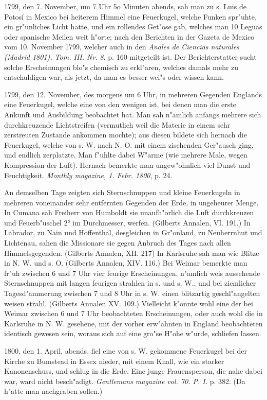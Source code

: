 \documentclass[a4paper, 11pt, oneside, polutonikogreek, german]{article}
\begin{document}
1799, den 7. November, um 7 Uhr 5o Minuten abends, sah man zu s. Luis de Potosí in Mexico bei heiterem Himmel eine Feuerkugel, welche Funken spr"uhte, ein gr"unliches Licht hatte, und ein rollendes Get"ose gab, welches man 10 Leguas oder spanische Meilen weit h"orte; nach den Berichten in der Gazeta de Mexico vom 10. November 1799, welcher auch in den \emph{Anales de Ciencias naturales (Madrid 1801), Tom. III. Nr. 8}, p. 160 mitgeteilt ist. Der Berichterstatter sucht solche Erscheinungen blo"s chemisch zu erkl"aren, welches damals mehr zu entschuldigen war, als jetzt, da man es besser wei"s oder wissen kann.

1799, den 12. November, des morgens um 6 Uhr, in mehreren Gegenden Englands eine Feuerkugel, welche eine von den wenigen ist, bei denen man die erste Ankunft und Ausbildung beobachtet hat. Man sah n"amlich anfangs mehrere sich durchkreuzende Lichtstreifen (vermutlich weil die Materie in einem sehr zerstreuten Zustande ankommen mochte); aus diesen bildete sich hernach die Feuerkugel, welche von s. W. nach N. O. mit einem zischenden Ger"ausch ging, und endlich zerplatzte. Man f"uhlte dabei W"arme (wie mehrere Male, wegen Kompression der Luft). Hernach bemerkte man ungew"ohnlich viel Dunst und Feuchtigkeit. \emph{Monthly magazine, 1. Febr. 1800}, p. 24.

An demselben Tage zeigten sich Sternschnuppen und kleine Feuerkugeln in mehreren voneinander sehr entfernten Gegenden der Erde, in ungeheurer Menge. In Cumana sah Freiherr von Humboldt sie unaufh"orlich die Luft durchkreuzen und Feuerb"uschel 2° im Durchmesser, werfen. (Gilberts Annalen, VI. 191.) In Labrador, zu Nain und Hoffenthal, desgleichen in Gr"onland, zu Neuherrnhut und Lichtenau, sahen die Missionare sie gegen Anbruch des Tages nach allen Himmelsgegenden. (Gilberts Annalen, XII. 217) In Karlsruhe sah man wie Blitze in N. W. und s. O. (Gilberts Annalen, XIV. 116.) Bei Weimar bemerkte man fr"uh zwischen 6 und 7 Uhr vier feurige Erscheinungen, n"amlich weis aussehende Sternschnuppen mit langen feurigen strahlen in s. und s. W., und bei ziemlicher Tagesd"ammerung zwischen 7 und 8 Uhr in s. W. einen blitzartig geschl"angelten weisen strahl. (Gilberts Annalen XV. 109.) Vielleicht k"onnte wohl eine der bei Weimar zwischen 6 und 7 Uhr beobachteten Erscheinungen, oder auch wohl die in Karlsruhe in N. W. gesehene, mit der vorher erw"ahnten in England beobachteten identisch gewesen sein, woraus sich auf eine gro"se H"ohe w"urde, schliefen lassen.

1800, den 1. April, abends, fiel eine von s. W. gekommene Feuerkugel bei der Kirche zu Bumstead in Essex nieder, mit einem Knall, wie ein starker Kanonenschuss, und schlug in die Erde. Eine junge Frauensperson, die nahe dabei war, ward nicht besch"adigt. \emph{Gentlemans magazine vol. 70. P. I.} p. 382. (Da h"atte man nachgraben sollen.)
\end{document}
